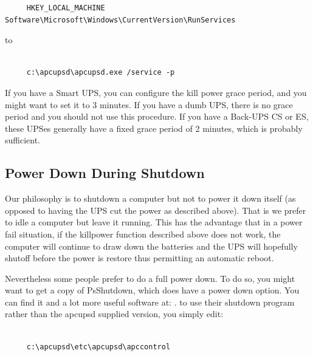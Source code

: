 {{{{{{{{{{\begin{verbatim}
     HKEY_LOCAL_MACHINE Software\Microsoft\Windows\CurrentVersion\RunServices
\end{verbatim}
\normalsize

to 

\footnotesize
\begin{verbatim}
     
     c:\apcupsd\apcupsd.exe /service -p
\end{verbatim}
\normalsize

If you have a Smart UPS, you can configure the kill power grace period, and
you might want to set it to 3 minutes. If you have a dumb UPS, there is no
grace period and you should not use this procedure. If you have a Back-UPS CS
or ES, these UPSes generally have a fixed grace period of 2 minutes, which is
probably sufficient. 

\label{Power-Down-During-Shutdown}

\subsection*{Power Down During Shutdown}

\label{index-Windows_002c-Power-down-184}
\label{index-Power-down_002c-Windows-185}
Our philosophy is to shutdown a computer but not to power it down itself (as
opposed to having the UPS cut the power as described above). That is we prefer
to idle a computer but leave it running. This has the advantage that in a
power fail situation, if the killpower function described above does not work,
the computer will continue to draw down the batteries and the UPS will
hopefully shutoff before the power is restore thus permitting an automatic
reboot.  

Nevertheless some people prefer to do a full power down. To do so, you might
want to get a copy of PsShutdown, which does have a power down option. You can
find it and a lot more useful software at: 
. to use their shutdown program
rather than the apcupsd supplied version, you simply edit: 

\footnotesize
\begin{verbatim}
     
     c:\apcupsd\etc\apcupsd\apccontrol
\end{verbatim}
\normalsize

}}}}}}}}}}
